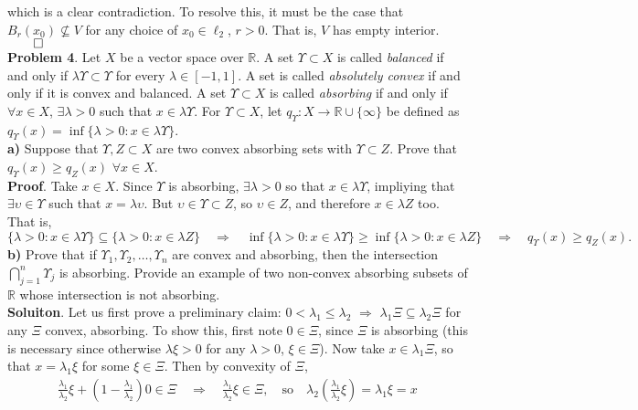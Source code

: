 \documentclass[10pt]{article}
\newcommand{\mbb}[1]{\mathbb{#1}}
\newcommand{\1}[1]{\mathbbm{1}_{#1}}
\begin{document}
    which is a clear contradiction. To resolve this, it must be the case that
    $B_r(x_0)\nsubseteq V$ for any choice of $x_0\in\ell_2$, $r>0$. That is, $V$
    has empty interior.\hfill{$\qed$}\\[5pt]
    {\bf Problem 4}. Let $X$ be a vector space over $\mbb{R}$. A set
    $\Upsilon\subset X$ is called {\it balanced} if and only if
    $\lambda\Upsilon\subset\Upsilon$ for every $\lambda\in[-1,1]$. A set is
    called {\it absolutely convex} if and only if it is convex and balanced. A
    set $\Upsilon \subset X$ is called {\it absorbing} if and only if $\forall
    x\in X$, $\exists \lambda >0$ such that $x\in\lambda\Upsilon$. For $\Upsilon
    \subset X$, let $q_\Upsilon:X\rightarrow \mbb{R}\cup\{\infty\}$ be defined
    as $q_\Upsilon(x)=\inf\{\lambda>0:x\in\lambda\Upsilon\}$. \\[5pt]
    {\bf a)} Suppose that $\Upsilon, Z\subset X$ are two convex absorbing sets
    with $\Upsilon\subset Z$. Prove that $q_\Upsilon(x)\geq q_Z(x)$ $\forall
    x\in X$.\\[5pt]
    {\bf Proof}. Take $x\in X$. Since $\Upsilon$ is absorbing,
    $\exists\lambda>0$ so that $x\in\lambda\Upsilon$, impliying that
    $\exists\upsilon\in\Upsilon$ such that $x=\lambda\upsilon$. But
    $\upsilon\in\Upsilon\subset Z$, so $\upsilon\in Z$, and therefore
    $x\in\lambda Z$ too. That is,
    \[\{\lambda>0:x\in\lambda\Upsilon\}\subseteq\{\lambda>0:x\in\lambda
    Z\}\quad\Rightarrow\quad\inf\{\lambda>0:x\in\lambda\Upsilon\}\geq
    \inf\{\lambda>0:x\in\lambda Z\}\quad\Rightarrow\quad q_\Upsilon(x)\geq
    q_Z(x).\tag*{$\qed$}\] {\bf b)} Prove that if
    $\Upsilon_1,\Upsilon_2,\dots,\Upsilon_n$ are convex and absorbing, then the
    intersection $\bigcap_{j=1}^n\Upsilon_j$ is absorbing. Provide an example of
    two non-convex absorbing subsets of $\mbb{R}$ whose intersection is not
    absorbing.\\[5pt]
    {\bf Soluiton}. Let us first prove a preliminary claim: $0<\lambda_1\leq
    \lambda_2$ $\Rightarrow$ $\lambda_1\Xi\subseteq\lambda_2\Xi$ for any $\Xi$
    convex, absorbing. To show this, first note $0\in\Xi$, since $\Xi$ is
    absorbing (this is necessary since otherwise $\lambda\xi>0$ for any
    $\lambda>0$, $\xi\in\Xi$). Now take $x\in\lambda_1\Xi$, so that
    $x=\lambda_1\xi$ for some $\xi\in\Xi$. Then by convexity of $\Xi$, 
    \begin{align*}
        \frac{\lambda_1}{\lambda_2}\xi+(1-\frac{\lambda_1}{\lambda_2})0\in\Xi\quad\Rightarrow\quad\frac{\lambda_1}{\lambda_2}\xi\in\Xi,\quad\text{so}\quad\lambda_2(\frac{\lambda_1}{\lambda_2}\xi)=\lambda_1\xi=x
    \end{align*}
\end{document}
